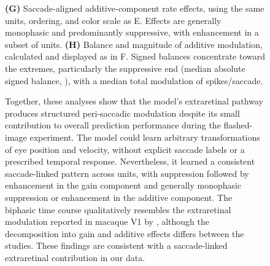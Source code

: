 \documentclass{lite}
\begin{document}
\begin{figure}[p]
{  \textbf{(G)} Saccade-aligned additive-component rate effects, using the same units, ordering, and color scale as E. Effects are generally monophasic and predominantly suppressive, with enhancement in a subset of units.
  \textbf{(H)} Balance and magnitude of additive modulation, calculated and displayed as in F. Signed balances concentrate toward the extremes, particularly the suppressive end (median absolute signed balance, \EDThreeAdditiveBalance{}), with a median total modulation of \EDThreeAdditiveTotal{} spikes/saccade.

  Together, these analyses show that the model's extraretinal pathway produces structured peri-saccadic modulation despite its small contribution to overall prediction performance during the flashed-image experiment. The model could learn arbitrary transformations of eye position and velocity, without explicit saccade labels or a prescribed temporal response. Nevertheless, it learned a consistent saccade-linked pattern across units, with suppression followed by enhancement in the gain component and generally monophasic suppression or enhancement in the additive component. The biphasic time course qualitatively resembles the extraretinal modulation reported in macaque V1 by \citet{mcfarland2015saccadic}, although the decomposition into gain and additive effects differs between the studies. These findings are consistent with a saccade-linked extraretinal contribution in our data.
  }
  \label{fig:extraretinal_saccade_modulation}
\end{figure}

\clearpage
\end{document}
